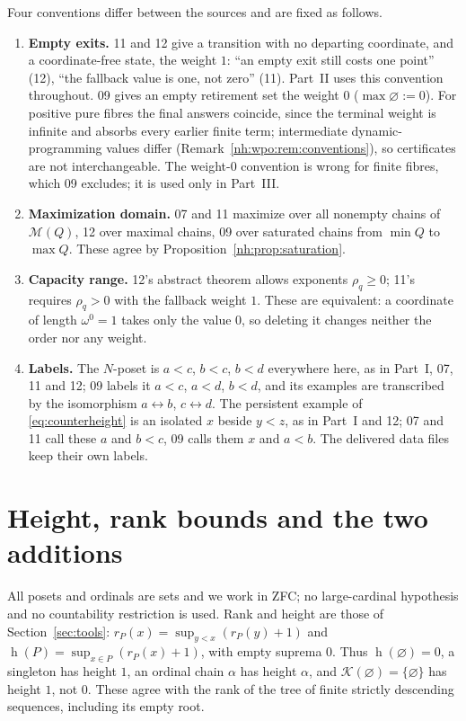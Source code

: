 \documentclass[11pt,a4paper]{article}
\theoremstyle{definition}
\theoremstyle{remark}
\newcommand{\K}{\mathcal K}
\newcommand{\M}{\mathcal M}
\newcommand{\hgt}{\operatorname{h}}
\begin{document}
Four conventions differ between the sources and are fixed as follows.
\begin{enumerate}
\item \textbf{Empty exits.} 11 and 12 give a transition with no departing
coordinate, and a coordinate-free state, the weight $1$: ``an empty exit
still costs one point'' (12), ``the fallback value is one, not zero'' (11).
Part~II uses this convention throughout. 09 gives an empty retirement set
the weight $0$ ($\max\varnothing:=0$). For positive pure fibres the final
answers coincide, since the terminal weight is infinite and absorbs every
earlier finite term; intermediate dynamic-programming values differ
(Remark~\ref{nh:wpo:rem:conventions}), so certificates are not
interchangeable. The weight-$0$ convention is wrong for finite fibres, which
09 excludes; it is used only in Part~III.
\item \textbf{Maximization domain.} 07 and 11 maximize over all nonempty
chains of $\M(Q)$, 12 over maximal chains, 09 over saturated chains from
$\min Q$ to $\max Q$. These agree by
Proposition~\ref{nh:prop:saturation}.
\item \textbf{Capacity range.} 12's abstract theorem allows exponents
$\rho_q\ge0$; 11's requires $\rho_q>0$ with the fallback weight $1$. These
are equivalent: a coordinate of length $\omega^0=1$ takes only the value $0$,
so deleting it changes neither the order nor any weight.
\item \textbf{Labels.} The $N$-poset is $a<c$, $b<c$, $b<d$ everywhere here, as
in Part~I, 07, 11 and 12; 09 labels it $a<c$, $a<d$, $b<d$, and its
examples are transcribed by the isomorphism $a\leftrightarrow b$,
$c\leftrightarrow d$. The persistent example of \eqref{eq:counterheight} is
an isolated $x$ beside $y<z$, as in Part~I and 12; 07 and 11 call these
$a$ and $b<c$, 09 calls them $x$ and $a<b$. The delivered data files keep
their own labels.
\end{enumerate}

\section{Height, rank bounds and the two additions}\label{nh:sec:prelim}

All posets and ordinals are sets and we work in ZFC; no large-cardinal
hypothesis and no countability restriction is used. Rank and height are
those of Section~\ref{sec:tools}: $r_P(x)=\sup_{y<x}(r_P(y)+1)$ and
$\hgt(P)=\sup_{x\in P}(r_P(x)+1)$, with empty suprema $0$. Thus
$\hgt(\varnothing)=0$, a singleton has height $1$, an ordinal chain $\alpha$
has height $\alpha$, and $\K(\varnothing)=\{\varnothing\}$ has height $1$, not
$0$. These agree with the rank of the tree of finite strictly descending
sequences, including its empty root.
\end{document}
